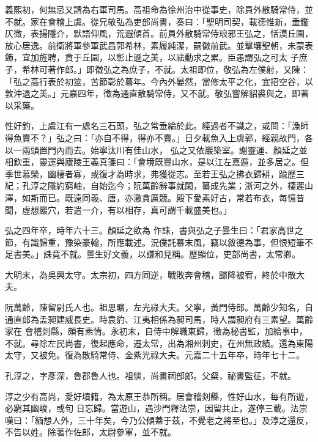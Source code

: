 \begin{pinyinscope}
 義熙初，何無忌又請為右軍司馬。高祖命為徐州治中從事史，除員外散騎常侍，並不就。家在會稽上虞。從兄敬弘為吏部尚書，奏曰：「聖明司契，載德惟新，垂鑑仄微，表揚隱介，默語仰風，荒遐傾首。前員外散騎常侍琅邪王弘之，恬漠丘園，放心居逸。前衛將軍參軍武昌郭希林，素履純潔，嗣徽前武。並擊壤聖朝，未蒙表飾，宜加旌聘，賁于丘園，以彰止遜之美，以祛動求之累。臣愚謂弘之可太
 子庶子，希林可著作郎。」即徵弘之為庶子，不就。太祖即位，敬弘為左僕射，又陳：「弘之高行表於初筮，苦節彰於暮年。今內外晏然，當修太平之化，宜招空谷，以敦沖退之美。」元嘉四年，徵為通直散騎常侍，又不就。敬弘嘗解貂裘與之，即著以采藥。



 性好釣，上虞江有一處名三石頭，弘之常垂綸於此。經過者不識之，或問：「漁師得魚賣不？」弘之曰：「亦自不得，得亦不賣。」日夕載魚入上虞郭，經親故門，各以一兩頭置門內而去。始寧汰川有佳山水，
 弘之又依巖築室。謝靈運、顏延之並相欽重，靈運與廬陵王義真箋曰：「會境既豐山水，是以江左嘉遁，並多居之。但季世慕榮，幽棲者寡，或復才為時求，弗獲從志。至若王弘之拂衣歸耕，踰歷三紀；孔淳之隱約窮岫，自始迄今；阮萬齡辭事就閑，纂成先業；浙河之外，棲遲山澤，如斯而已。既遠同羲、唐，亦激貪厲競。殿下愛素好古，常若布衣，每憶昔聞，虛想巖穴，若遣一介，有以相存，真可謂千載盛美也。」



 弘之四年卒，時年六十三。顏延之欲為
 作誄，書與弘之子曇生曰：「君家高世之節，有識歸重，豫染豪翰，所應載述。況僕託慕末風，竊以敘德為事，但恨短筆不足書美。」誄竟不就。曇生好文義，以謙和見稱。歷顯位，吏部尚書，太常卿。



 大明末，為吳興太守。太宗初，四方同逆，戰敗奔會稽，歸降被宥，終於中散大夫。



 阮萬齡，陳留尉氏人也。祖思曠，左光祿大夫。父寧，黃門侍郎。萬齡少知名，自通直郎為孟昶建威長史。時袁豹、江夷相係為昶司馬，時人謂昶府有三素望。萬齡家在
 會稽剡縣，頗有素情。永初末，自侍中解職東歸，徵為秘書監，加給事中，不就。尋除左民尚書，復起應命，遷太常，出為湘州刺史，在州無政績。還為東陽太守，又被免。復為散騎常侍、金紫光祿大夫。元嘉二十五年卒，時年七十二。



 孔淳之，字彥深，魯郡魯人也。祖惔，尚書祠部郎。父粲，祕書監征，不就。



 淳之少有高尚，愛好墳籍，為太原王恭所稱。居會稽剡縣，性好山水，每有所遊，必窮其幽峻，或旬
 日忘歸。當遊山，遇沙門釋法崇，因留共止，遂停三載。法崇嘆曰：「緬想人外，三十年矣，今乃公傾蓋于茲，不覺老之將至也。」及淳之還反，不告以姓。除著作佐郎，太尉參軍，並不就。




\end{pinyinscope}

